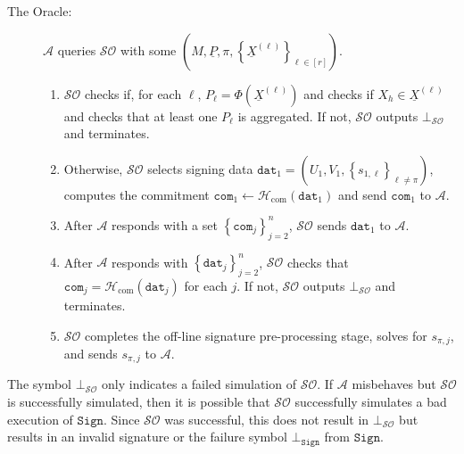 \documentclass{iacrtrans}
\theoremstyle{definition}
\numberwithin{theorem}{subsection}
\numberwithin{lemma}{theorem}
\newcommand{\adversary}{\mathcal{A}}
\begin{document}
\begin{description}
\item [The Oracle:] $\adversary$ queries $\mathcal{SO}$ with some $\left(M, \underline{P}, \pi, \left\{\underline{X}^{(\ell)}\right\}_{\ell \in [r]}\right)$.

\begin{enumerate}
\item $\mathcal{SO}$ checks if, for each $\ell$, $P_\ell = \Phi(\underline{X}^{(\ell)})$ and checks if $X_h \in \underline{X}^{(\ell)}$ and checks that at least one $P_\ell$ is aggregated. If not, $\mathcal{SO}$ outputs $\bot_{\mathcal{SO}}$ and terminates.


\item \label{dat1} Otherwise, $\mathcal{SO}$ selects signing data $\texttt{dat}_1 = (U_1, V_1, \left\{s_{1, \ell}\right\}_{\ell \neq \pi})$, computes the commitment $\texttt{com}_1 \leftarrow \mathcal{H}_{\text{com}}(\texttt{dat}_1)$ and send  $\texttt{com}_1$ to $\adversary$. %

\item After $\adversary$ responds with a set $\left\{\texttt{com}_j\right\}_{j = 2}^{n}$, $\mathcal{SO}$ sends $\texttt{dat}_{1}$ to $\adversary$. 

\item After $\adversary$ responds with $\left\{\texttt{dat}_{j}\right\}_{j=2}^{n}$, $\mathcal{SO}$ checks that $\texttt{com}_j = \mathcal{H}_{\text{com}}(\texttt{dat}_j)$ for each $j$. If not, $\mathcal{SO}$ outputs $\bot_{\mathcal{SO}}$ and terminates.

\item $\mathcal{SO}$ completes the off-line signature pre-processing stage, solves for $s_{\pi, j}$, and sends $s_{\pi,j}$ to $\adversary$. 

\end{enumerate} 

\end{description}

The symbol $\bot_{\mathcal{SO}}$ only indicates a failed simulation of  $\mathcal{SO}$.  If $\adversary$ misbehaves but $\mathcal{SO}$ is successfully simulated, then it is possible that $\mathcal{SO}$ successfully simulates a bad execution of $\texttt{Sign}$. Since $\mathcal{SO}$ was successful, this does not result in $\bot_{\mathcal{SO}}$ but results in an invalid signature or the failure symbol $\bot_{\texttt{Sign}}$ from $\texttt{Sign}$. 
\end{document}
